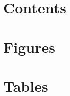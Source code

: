 
\renewcommand{\contentsname}{}
\renewcommand{\listfigurename}{}
\renewcommand{\listtablename}{}

\chapter*{Contents}
\label{contents}
\vspace{-3.5cm}

\begin{singlespacing}
{\hypersetup{linkcolor=black}
\tableofcontents
}
\end{singlespacing}
\clearpage

\chapter*{Figures}
\label{figures}
\vspace{-3.5cm}

\begin{singlespacing}
{\hypersetup{linkcolor=black}
\listoffigures
}
\end{singlespacing}
\clearpage

\chapter*{Tables}
\label{tables}
\vspace{-3.5cm}

